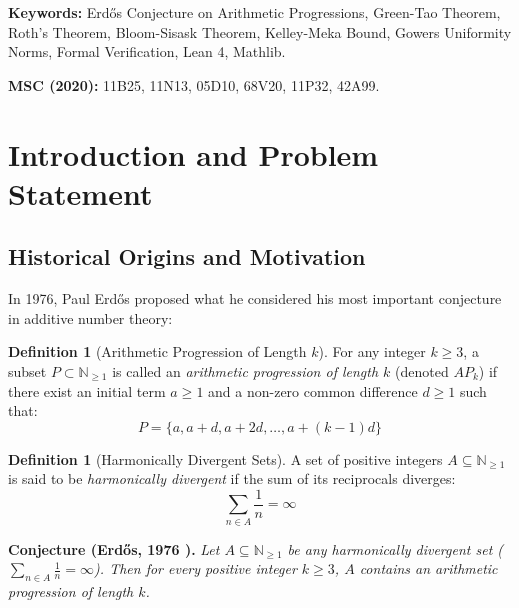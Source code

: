 \documentclass[11pt,a4paper]{article}
\theoremstyle{definition}
\newtheorem{definition}[theorem]{Definition}
\begin{document}
\vspace{0.5em}
\noindent\textbf{Keywords:} Erd\H{o}s Conjecture on Arithmetic Progressions, Green-Tao Theorem, Roth's Theorem, Bloom-Sisask Theorem, Kelley-Meka Bound, Gowers Uniformity Norms, Formal Verification, Lean 4, Mathlib.

\noindent\textbf{MSC (2020):} 11B25, 11N13, 05D10, 68V20, 11P32, 42A99.

\tableofcontents
\newpage

\section{Introduction and Problem Statement}

\subsection{Historical Origins and Motivation}
In 1976, Paul Erd\H{o}s \cite{erdos1976} proposed what he considered his most important conjecture in additive number theory:

\begin{definition}[Arithmetic Progression of Length $k$]\label{def:ap_k}
For any integer $k \ge 3$, a subset $P \subset \mathbb{N}_{\ge 1}$ is called an \emph{arithmetic progression of length $k$} (denoted $AP_k$) if there exist an initial term $a \ge 1$ and a non-zero common difference $d \ge 1$ such that:
\begin{equation}\label{eq:ap_def}
P = \{a, a + d, a + 2d, \dots, a + (k - 1)d\}
\end{equation}
\end{definition}

\begin{definition}[Harmonically Divergent Sets]\label{def:divergent_set}
A set of positive integers $A \subseteq \mathbb{N}_{\ge 1}$ is said to be \emph{harmonically divergent} if the sum of its reciprocals diverges:
\begin{equation}\label{eq:reciprocal_sum}
\sum_{n \in A} \frac{1}{n} = \infty
\end{equation}
\end{definition}

\noindent\textbf{Conjecture (Erd\H{o}s, 1976 \cite{erdos1976}).} \textit{Let $A \subseteq \mathbb{N}_{\ge 1}$ be any harmonically divergent set ($\sum_{n \in A} \frac{1}{n} = \infty$). Then for every positive integer $k \ge 3$, $A$ contains an arithmetic progression of length $k$.}
\end{document}
